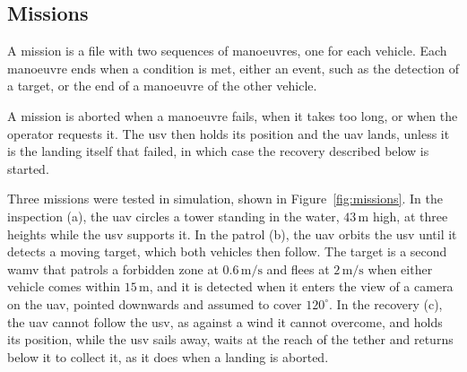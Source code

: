 \subsection{Missions}
\label{subsec:missions_coordination}

A mission is a file with two sequences of manoeuvres, one for each vehicle. Each manoeuvre ends when a condition is met, either an event, such as the detection of a target, or the end of a manoeuvre of the other vehicle.

A mission is aborted when a manoeuvre fails, when it takes too long, or when the operator requests it. The \gls{usv} then holds its position and the \gls{uav} lands, unless it is the landing itself that failed, in which case the recovery described below is started.

Three missions were tested in simulation, shown in Figure~\ref{fig:missions}. In the inspection (a), the \gls{uav} circles a tower standing in the water, $43\,\text{m}$ high, at three heights while the \gls{usv} supports it. In the patrol (b), the \gls{uav} orbits the \gls{usv} until it detects a moving target, which both vehicles then follow. The target is a second \gls{wamv} that patrols a forbidden zone at $0.6\,\text{m/s}$ and flees at $2\,\text{m/s}$ when either vehicle comes within $15\,\text{m}$, and it is detected when it enters the view of a camera on the \gls{uav}, pointed downwards and assumed to cover $120^\circ$. In the recovery (c), the \gls{uav} cannot follow the \gls{usv}, as against a wind it cannot overcome, and holds its position, while the \gls{usv} sails away, waits at the reach of the tether and returns below it to collect it, as it does when a landing is aborted.


